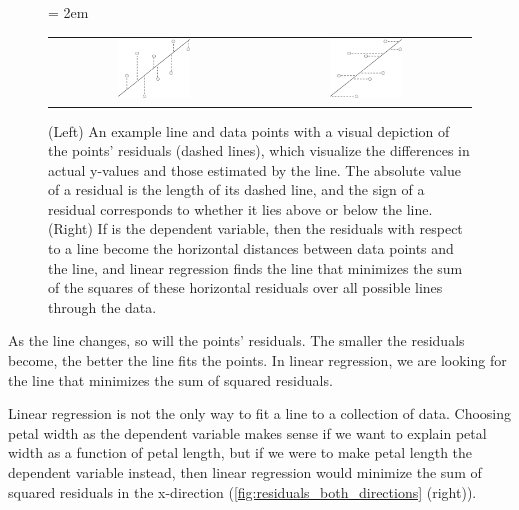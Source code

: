 \begin{figure}[h]
\centering
\mySfFamily
\tabcolsep = 2em
\begin{tabular}{c c}
\includegraphics[width = 0.36\textwidth]{../images/residuals_y_coordinates.png} & \includegraphics[width = 0.36\textwidth]{../images/residuals_x_coordinates.png}
\end{tabular}
\caption{(Left) An example line and data points with a visual depiction of the points' residuals (dashed lines), which visualize the differences in actual y-values and those estimated by the line. The absolute value of a residual is the length of its dashed line, and the sign of a residual corresponds to whether it lies above or below the line. (Right) If  is the dependent variable, then the residuals with respect to a line become the horizontal distances between data points and the line, and linear regression finds the line that minimizes the sum of the squares of these horizontal residuals over all possible lines through the data.}
\label{fig:residuals_both_directions}
\end{figure}

As the line changes, so will the points' residuals. The smaller the residuals become, the better the line fits the points. In linear regression, we are looking for the line that minimizes the sum of squared residuals.

Linear regression is not the only way to fit a line to a collection of data. Choosing petal width as the dependent variable makes sense if we want to explain petal width as a function of petal length, but if we were to make petal length the dependent variable instead, then linear regression would minimize the sum of squared residuals in the x-direction (\autoref{fig:residuals_both_directions} (right)).\\


